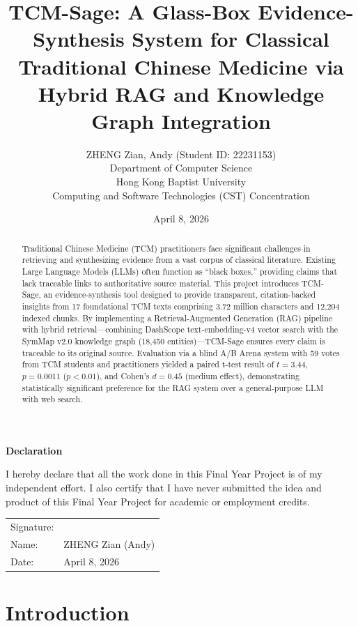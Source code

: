 \documentclass[11pt,a4paper]{report}
\title{TCM-Sage: A Glass-Box Evidence-Synthesis System for Classical Traditional Chinese Medicine via Hybrid RAG and Knowledge Graph Integration}
\author{ZHENG Zian, Andy (Student ID: 22231153) \\ 
        Department of Computer Science \\ 
        Hong Kong Baptist University \\
        Computing and Software Technologies (CST) Concentration}
\date{April 8, 2026}
\begin{document}
\maketitle

\newpage
\thispagestyle{empty}
\begin{center}
\vspace*{5cm}
{\Large\bfseries Declaration}
\end{center}
\vspace{2cm}
I hereby declare that all the work done in this Final Year Project is of my independent effort. I also certify that I have never submitted the idea and product of this Final Year Project for academic or employment credits.

\vspace{3cm}
\noindent
\begin{tabular}{ll}
Signature: & \underline{\hspace{6cm}} \\[1cm]
Name: & ZHENG Zian (Andy) \\[1cm]
Date: & April 8, 2026 \\
\end{tabular}
\newpage

\begin{abstract}
Traditional Chinese Medicine (TCM) practitioners face significant challenges in retrieving and synthesizing evidence from a vast corpus of classical literature. Existing Large Language Models (LLMs) often function as ``black boxes,'' providing claims that lack traceable links to authoritative source material. This project introduces TCM-Sage, an evidence-synthesis tool designed to provide transparent, citation-backed insights from 17 foundational TCM texts comprising 3.72 million characters and 12,204 indexed chunks. By implementing a Retrieval-Augmented Generation (RAG) pipeline with hybrid retrieval---combining DashScope text-embedding-v4 vector search with the SymMap v2.0 knowledge graph (18,450 entities)---TCM-Sage ensures every claim is traceable to its original source. Evaluation via a blind A/B Arena system with 59 votes from TCM students and practitioners yielded a paired t-test result of $t = 3.44$, $p = 0.0011$ ($p < 0.01$), and Cohen's $d = 0.45$ (medium effect), demonstrating statistically significant preference for the RAG system over a general-purpose LLM with web search.
\end{abstract}

\tableofcontents

\chapter{Introduction}
\end{document}
